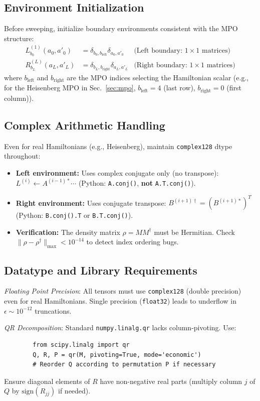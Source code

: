 \documentclass[aps,prb,onecolumn,scriptaddress]{revtex4-2}
\begin{document}
		
	\subsection{Environment Initialization}
	Before sweeping, initialize boundary environments consistent with the MPO structure:
	\begin{align}
		L^{(1)}_{b_0}(a_0, a'_0) &= \delta_{b_0, b_{\text{left}}} \delta_{a_0, a'_0} & \text{(Left boundary: $1 \times 1$ matrices)} \\
		R^{(L)}_{b_L}(a_L, a'_L) &= \delta_{b_L, b_{\text{right}}} \delta_{a_L, a'_L} & \text{(Right boundary: $1 \times 1$ matrices)}
	\end{align}
	where $b_{\text{left}}$ and $b_{\text{right}}$ are the MPO indices selecting the Hamiltonian scalar (e.g., for the Heisenberg MPO in Sec.~\ref{sec:mpo}, $b_{\text{left}}=4$ (last row), $b_{\text{right}}=0$ (first column)).
	
	\subsection{Complex Arithmetic Handling}
	Even for real Hamiltonians (e.g., Heisenberg), maintain \texttt{complex128} dtype throughout:
	\begin{itemize}
		\item \textbf{Left environment:} Uses complex conjugate only (no transpose):
		$L^{(i)} \gets A^{(i-1)*} \cdots$ (Python: \texttt{A.conj()}, \textbf{not} \texttt{A.T.conj()}).
		\item \textbf{Right environment:} Uses conjugate transpose: $B^{(i+1)\dagger} = (B^{(i+1)*})^T$ 
		(Python: \texttt{B.conj().T} or \texttt{B.T.conj()}).
		\item \textbf{Verification:} The density matrix $\rho = M M^\dagger$ must be Hermitian. 
		Check $\|\rho - \rho^\dagger\|_{\max} < 10^{-14}$ to detect index ordering bugs.
	\end{itemize}
	
	\subsection{Datatype and Library Requirements}
	
	\textit{Floating Point Precision}: All tensors must use \texttt{complex128} (double precision) even for real Hamiltonians. Single precision (\texttt{float32}) leads to underflow in $\epsilon \sim 10^{-12}$ truncations.
	
	\textit{QR Decomposition}: Standard \texttt{numpy.linalg.qr} lacks column-pivoting. Use:
	\begin{verbatim}
		from scipy.linalg import qr
		Q, R, P = qr(M, pivoting=True, mode='economic')
		# Reorder Q according to permutation P if necessary
	\end{verbatim}
	Ensure diagonal elements of $R$ have non-negative real parts (multiply column $j$ of $Q$ by $\text{sign}(R_{jj})$ if needed).
	
\end{document}
